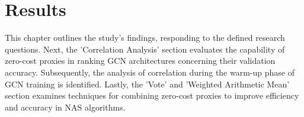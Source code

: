 \chapter{Results}\label{results}
\begin{comment}
In this chapter, we present the results of our investigation into the use of zero-cost proxies in neural architecture search (NAS) for graph convolutional networks (GCN). We address three research questions about using proxies in NAS for GCN, as outlined in the introduction chapter (\ref{section:goalsandrq}). Specifically, we analyze the effectiveness of different zero-cost proxies in ranking GCN architectures, examine the impact of incorporating proxies in the NAS algorithm and investigate the effectiveness of using an ensemble of proxies in NAS.
\end{comment}

\begin{comment}
Chapter 5 of the thesis presents the results of an investigation into the use of zero-cost proxies in neural architecture search for graph convolutional networks. The chapter includes a section on correlation and a vote section that analyze the effectiveness of different zero-cost proxies in ranking GCN architectures. Additionally, a section on supervised learning using Recursive Feature Elimination with Cross-Validation and Pointwise Ranking with Regression and Cross-Validation is included. Finally, the chapter addresses three research questions about the use of proxies in NAS for GCN and examines the impact of incorporating proxies in the NAS algorithm and investigates the effectiveness of using an ensemble of proxies in NAS.
\end{comment}

This chapter outlines the study's findings, responding to the defined research questions. Next, the 'Correlation Analysis' section evaluates the capability of zero-cost proxies in ranking GCN architectures concerning their validation accuracy. Subsequently, the analysis of correlation during the warm-up phase of GCN training is identified. Lastly, the 'Vote' and 'Weighted Arithmetic Mean' section examines techniques for combining zero-cost proxies to improve efficiency and accuracy in NAS algorithms.









%

